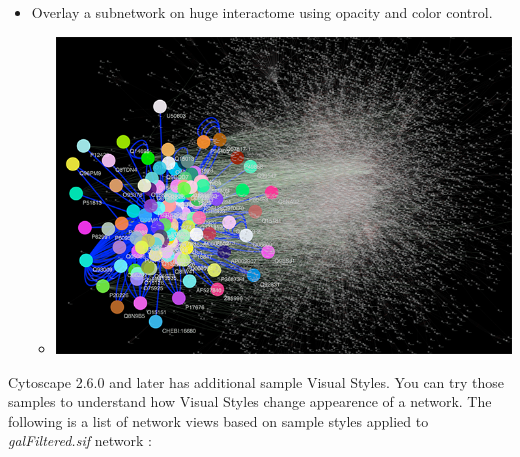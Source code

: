 \begin{itemize}
\begin{itemize}
\end{itemize}

\item Overlay a subnetwork on huge interactome using opacity and color control. \begin{itemize}
\item 

 \includegraphics[width=.6\textwidth]{images/Overlay.png} 


\end{itemize}


\end{itemize}


 Cytoscape 2.6.0 and later has additional sample Visual Styles. You can try those samples to understand how Visual Styles change appearence of a network. The following is a list of network views based on sample styles applied to \emph{galFiltered.sif}
 network : 


